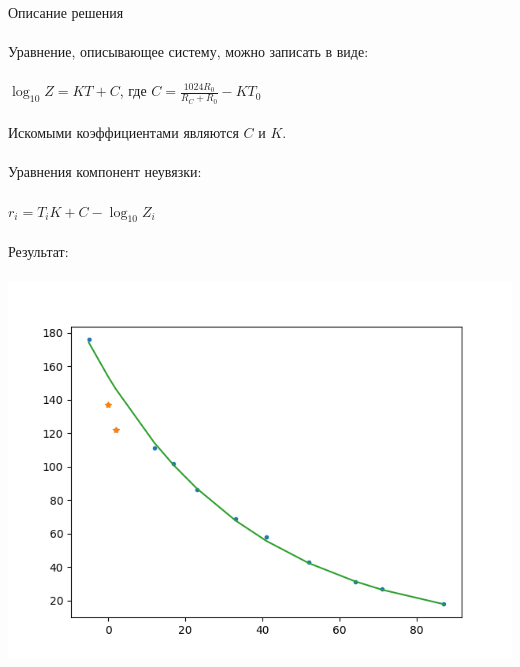 \documentclass{article}
\begin{document}
    Описание решения\\\\
    Уравнение, описывающее систему, можно записать в виде:\\\\
    $\log_{10} Z = KT + C$, где $C = \frac{1024R_0}{R_C + R_0} - KT_0$\\\\
    Искомыми коэффициентами являются $C$ и $K$.\\\\
    Уравнения компонент неувязки:\\\\
    $r_i = T_{i}K + C - \log_{10}Z_i$\\\\
    Результат:\\\\
    \includegraphics{graphic}
\end{document}
